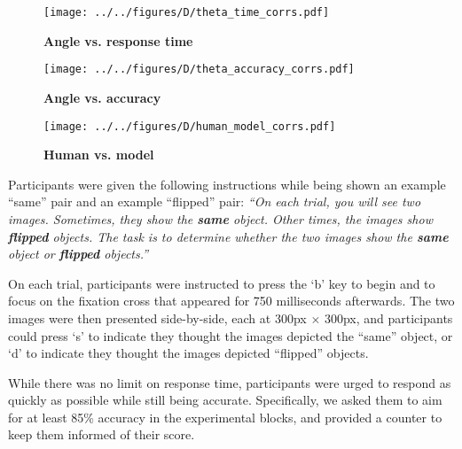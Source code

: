 \documentclass[10pt,letterpaper]{article}
\newcommand{\Oc}[0]{Oracle}
\newcommand{\Th}[0]{Threshold}
\begin{document}
\begin{figure*}[t]
  \centering
  \begin{subfigure}[b]{0.32\textwidth}
    \texttt{[image: ../../figures/D/theta\_time\_corrs.pdf]}
    \caption{\textbf{Angle vs. response time}}
    \label{fig:theta-time-corrs}
  \end{subfigure}%
  \begin{subfigure}[b]{0.32\textwidth}
    \texttt{[image: ../../figures/D/theta\_accuracy\_corrs.pdf]}
    \caption{\textbf{Angle vs. accuracy}}
    \label{fig:theta-accuracy-corrs}
  \end{subfigure}%
  \begin{subfigure}[b]{0.32\textwidth}
    \texttt{[image: ../../figures/D/human\_model\_corrs.pdf]}
    \caption{\textbf{Human vs. model}}
    \label{fig:human-model-corrs}
  \end{subfigure}
  \vspace{10pt}
  \caption{\textbf{Correlations.} (a) Spearman correlations between
    the minimum angle of rotation and response time. (b) Spearman
    correlations between the minimum angle of rotation and
    accuracy. The \Oc{} and \Th{} models had 100\% accuracy;
    therefore, their correlations are undefined. (c) Pearson
    correlations between human and model, both for response time and
    accuracy. The first set of bars is human vs. human, to give an
    upper bound. All error bars are 95\% confidence intervals.}
\end{figure*}

Participants were given the following instructions while being shown
an example ``same'' pair and an example ``flipped'' pair: \textit{``On
  each trial, you will see two images. Sometimes, they show the
  \textbf{same} object. Other times, the images show \textbf{flipped}
  objects. The task is to determine whether the two images show the
  \textbf{same} object or \textbf{flipped} objects.''}

On each trial, participants were instructed to press the `b' key to
begin and to focus on the fixation cross that appeared for 750
milliseconds afterwards. The two images were then presented
side-by-side, each at 300px $\times$ 300px, and participants could
press `s' to indicate they thought the images depicted the ``same''
object, or `d' to indicate they thought the images depicted
``flipped'' objects.

While there was no limit on response time, participants were urged to
respond as quickly as possible while still being
accurate. Specifically, we asked them to aim for at least 85\%
accuracy in the experimental blocks, and provided a counter to keep
them informed of their score.
\end{document}
